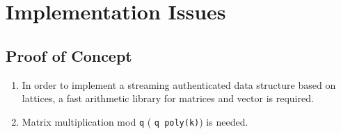 \documentclass[11pt, letterpaper, oneside]{article}
\begin{document}




\section{Implementation Issues\\}
\subsection{Proof of Concept}
\begin{enumerate}
\item In order to implement a streaming authenticated data structure based on lattices, a fast
arithmetic library for matrices and vector is required.
\item Matrix multiplication mod \texttt{q} ( \texttt{q poly(k)}) is needed.
\end{enumerate}
\end{document}
